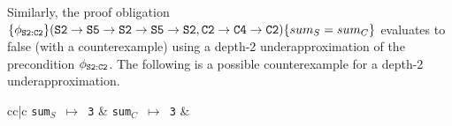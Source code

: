Similarly, the proof obligation
$\{\phi_{{\tt S2:C2}}\} ({\tt S2\rightarrow S5\rightarrow S2\rightarrow S5\rightarrow S2}, {\tt C2\rightarrow C4\rightarrow C2}) \\ \{sum_{S} = sum_{C}\}$
evaluates to false (with a counterexample) using
a depth-2 underapproximation of the precondition $\phi_{{\tt S2:C2}}$.
The following is a possible counterexample for a depth-2 underapproximation.
%
\begin{small}
\begin{center}
\begin{footnotesize}
\begin{tabular}{cc|c}
{\tt sum$_S$ $\mapsto$ 3} & {\tt sum$_C$ $\mapsto$ 3} &  \\
 \\
 \\
\end{tabular}
\end{footnotesize}
\end{center}
\end{small}
